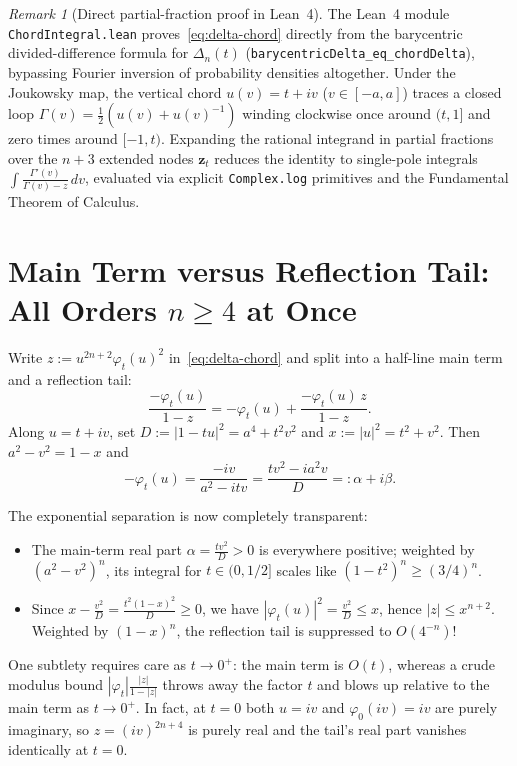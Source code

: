 \documentclass[11pt,a4paper]{article}
\newcommand{\code}[1]{\nolinkurl{#1}}
\theoremstyle{remark}
\newtheorem{remark}[proposition]{Remark}
\numberwithin{equation}{section}
\begin{document}
\begin{remark}[Direct partial-fraction proof in Lean~4]
    \label{rem:chord-lean}
    The Lean~4 module \code{ChordIntegral.lean} proves~\eqref{eq:delta-chord} directly from the barycentric divided-difference formula for $\Delta_n(t)$ (\code{barycentricDelta_eq_chordDelta}), bypassing Fourier inversion of probability densities altogether. Under the Joukowsky map, the vertical chord $u(v) = t + iv$ ($v \in [-a,a]$) traces a closed loop $\Gamma(v) = \frac12(u(v) + u(v)^{-1})$ winding clockwise once around $(t,1]$ and zero times around $[-1,t)$. Expanding the rational integrand in partial fractions over the $n+3$ extended nodes $\mathbf{z}_t$ reduces the identity to single-pole integrals $\int \frac{\Gamma'(v)}{\Gamma(v) - z}\,dv$, evaluated via explicit \code{Complex.log} primitives and the Fundamental Theorem of Calculus.
\end{remark}

\section{Main Term versus Reflection Tail: All Orders \texorpdfstring{$n \ge 4$}{n >= 4} at Once}
\label{sec:n4}

Write $z := u^{2n+2}\varphi_t(u)^2$ in~\eqref{eq:delta-chord} and split into a half-line main term and a reflection tail:
\[
    \frac{-\varphi_t(u)}{1 - z} = -\varphi_t(u) + \frac{-\varphi_t(u)\,z}{1 - z}.
\]
Along $u = t + iv$, set $D := |1 - tu|^2 = a^4 + t^2 v^2$ and $x := |u|^2 = t^2 + v^2$. Then $a^2 - v^2 = 1 - x$ and
\[
    -\varphi_t(u) = \frac{-iv}{a^2 - itv} = \frac{tv^2 - ia^2 v}{D} =: \alpha + i\beta.
\]

The exponential separation is now completely transparent:
\begin{itemize}[leftmargin=1.8em]
    \item The main-term real part $\alpha = \frac{tv^2}{D} > 0$ is everywhere positive; weighted by $(a^2 - v^2)^n$, its integral for $t \in (0, 1/2]$ scales like $(1 - t^2)^n \ge (3/4)^n$.
    \item Since $x - \frac{v^2}{D} = \frac{t^2(1 - x)^2}{D} \ge 0$, we have $|\varphi_t(u)|^2 = \frac{v^2}{D} \le x$, hence $|z| \le x^{n+2}$. Weighted by $(1 - x)^n$, the reflection tail is suppressed to $O(4^{-n})$!
\end{itemize}

One subtlety requires care as $t \to 0^+$: the main term is $O(t)$, whereas a crude modulus bound $|\varphi_t|\frac{|z|}{1-|z|}$ throws away the factor $t$ and blows up relative to the main term as $t \to 0^+$. In fact, at $t = 0$ both $u = iv$ and $\varphi_0(iv) = iv$ are purely imaginary, so $z = (iv)^{2n+4}$ is purely real and the tail's real part vanishes identically at $t = 0$.
\end{document}
